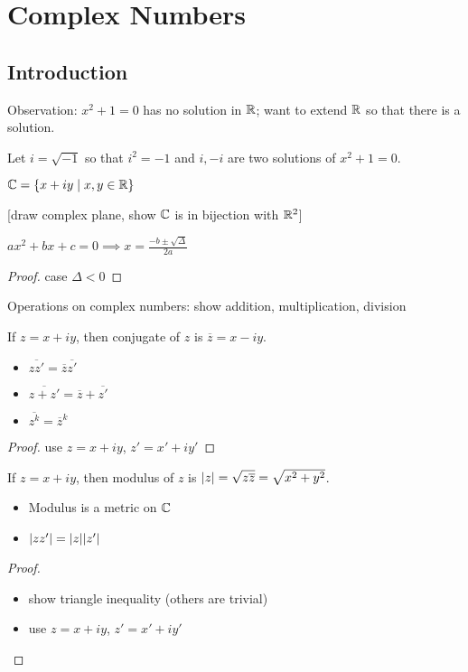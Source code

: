 \chapter{Complex Numbers}
\section{Introduction}
Observation: $x^2+1=0$ has no solution in $\mathbb{R}$; want to extend $\mathbb{R}$ so that there is a solution.
\begin{definition}
	Let $i=\sqrt{-1}$ so that $i^2=-1$ and $i,-i$ are two solutions of $x^2+1=0$.
\end{definition}
\begin{definition}
	$\mathbb{C} = \{ x+iy \mid x,y \in \mathbb{R} \}$
\end{definition}
[draw complex plane, show $\mathbb{C}$ is in bijection with $\mathbb{R}^2$]

\begin{proposition}
	$ax^2+bx+c=0 \implies x=\frac{-b \pm \sqrt{\Delta}}{2a}$
\end{proposition}
\begin{proof}
	case $\Delta<0$
\end{proof}

Operations on complex numbers: show addition, multiplication, division

\begin{definition}[Conjugate]
	If $z=x+iy$, then conjugate of $z$ is $\overline{z}=x-iy$.
\end{definition}
\begin{property}
	\begin{itemize}
		\item $\overline{zz'}=\overline{z}\overline{z'}$
		\item $\overline{z+z'}=\overline{z}+\overline{z'}$
		\item $\overline{z^k}=\overline{z}^k$
	\end{itemize}
\end{property}
\begin{proof}
	use $z=x+iy$, $z'=x'+iy'$
\end{proof}

\begin{definition}[Modulus]
	If $z=x+iy$, then modulus of $z$ is $| z |=\sqrt{z\overline{z}}=\sqrt{x^2+y^2}$.
\end{definition}
\begin{property}
	\begin{itemize}
		\item Modulus is a metric on $\mathbb{C}$
		\item $| zz' |=| z || z' |$
	\end{itemize}
\end{property}
\begin{proof}
	\begin{itemize}
		\item show triangle inequality (others are trivial)
		\item use $z=x+iy$, $z'=x'+iy'$
	\end{itemize}
\end{proof}



